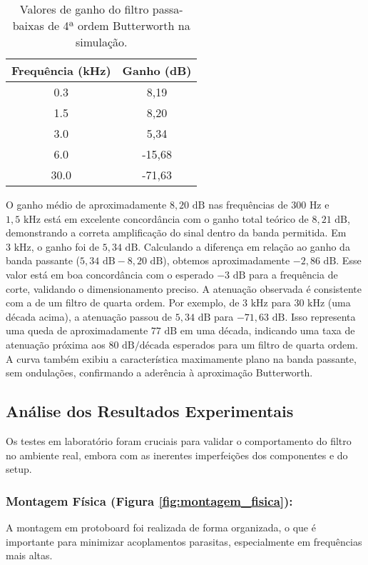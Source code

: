 \begin{table}[H]
\centering
\begin{tabular}{|c|c|}
\hline
\textbf{Frequência (kHz)} & \textbf{Ganho (dB)} \\
\hline
0.3 & 8,19 \\ \hline
1.5 & 8,20 \\ \hline
3.0 & 5,34 \\ \hline
6.0 & -15,68 \\ \hline
30.0 & -71,63 \\ \hline
\end{tabular}
\caption{Valores de ganho do filtro passa-baixas de 4ª ordem Butterworth na simulação.}
\label{tab:ganho_simulacao}
\end{table}

O ganho médio de aproximadamente $8,20 \text{ dB}$ nas frequências de $300 \text{ Hz}$ e $1,5 \text{ kHz}$ está em excelente concordância com o ganho total teórico de $8,21 \text{ dB}$, demonstrando a correta amplificação do sinal dentro da banda permitida.
Em $3 \text{ kHz}$, o ganho foi de $5,34 \text{ dB}$. Calculando a diferença em relação ao ganho da banda passante ($5,34 \text{ dB} - 8,20 \text{ dB}$), obtemos aproximadamente $-2,86 \text{ dB}$. Esse valor está em boa concordância com o esperado $-3 \text{ dB}$ para a frequência de corte, validando o dimensionamento preciso.
A atenuação observada é consistente com a de um filtro de quarta ordem. Por exemplo, de $3 \text{ kHz}$ para $30 \text{ kHz}$ (uma década acima), a atenuação passou de $5,34 \text{ dB}$ para $-71,63 \text{ dB}$. Isso representa uma queda de aproximadamente $77 \text{ dB}$ em uma década, indicando uma taxa de atenuação próxima aos $80 \text{ dB/década}$ esperados para um filtro de quarta ordem. A curva também exibiu a característica maximamente plano na banda passante, sem ondulações, confirmando a aderência à aproximação Butterworth.

\subsection{Análise dos Resultados Experimentais}
Os testes em laboratório foram cruciais para validar o comportamento do filtro no ambiente real, embora com as inerentes imperfeições dos componentes e do setup.

\subsubsection{Montagem Física (Figura \ref{fig:montagem_fisica}):} 
A montagem em protoboard foi realizada de forma organizada, o que é importante para minimizar acoplamentos parasitas, especialmente em frequências mais altas.

